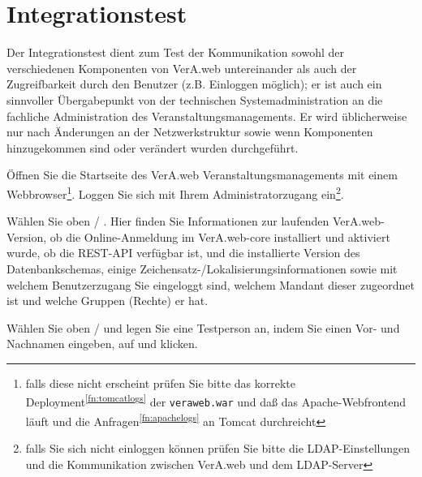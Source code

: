 \documentclass{tarentanleitung}
\newif\ifoa
\begin{document}
\section{Integrationstest}\label{sec:test}

Der Integrationstest dient zum Test der Kommunikation sowohl der
verschiedenen Komponenten von VerA.web untereinander als auch der
Zugreifbarkeit durch den Benutzer (z.B. Einloggen möglich); er ist auch
ein sinnvoller Übergabepunkt von der technischen Systemadministration
an die fachliche Administration des Veranstaltungsmanagements. Er wird
üblicherweise nur nach Änderungen an der Netzwerkstruktur sowie wenn
Komponenten hinzugekommen sind oder verändert wurden durchgeführt.

\ifoa
\subsection{VerA.web core und REST-API}
\fi%

Öffnen Sie die Startseite des VerA.web Veranstaltungsmanagements mit
einem Webbrowser\Hair\footnote{falls diese nicht erscheint prüfen Sie
bitte das korrekte Deployment\Hair\textsuperscript{\ref{fn:tomcatlogs}}
der \texttt{veraweb.war} und daß das Apache-Webfrontend läuft und die
Anfragen\Hair\textsuperscript{\ref{fn:apachelogs}} an Tomcat durchreicht}.
Loggen Sie sich mit Ihrem Administratorzugang ein\Hair\footnote{falls
Sie sich nicht einloggen können prüfen Sie bitte die LDAP-Einstellungen
und die Kommunikation zwischen VerA.web und dem LDAP-Server}.

%

Wählen Sie oben  / . Hier
finden Sie Informationen zur laufenden VerA.web-Version, ob die
Online-Anmeldung im VerA.web-core installiert und aktiviert wurde,
ob die REST-API verfügbar ist, und die installierte Version des
Datenbankschemas, einige Zeichensatz-/Lokalisierungsinformationen sowie
mit welchem Benutzerzugang Sie eingeloggt sind, %
welchem Mandant dieser zugeordnet ist und welche
Gruppen (Rechte) er hat.

Wählen Sie oben  / 
und legen Sie eine Testperson an, indem Sie einen Vor- und Nachnamen
eingeben, auf  und
 klicken.
\end{document}
